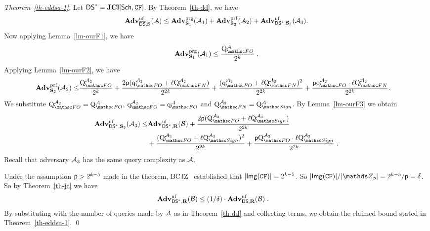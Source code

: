 \begin{proof}[Theorem~\ref{th-eddsa-1}] Let $\mathsf{DS}^* = \mathbf{JCl}[\mathsf{Sch},\mathtt{CF}]$. 
By Theorem~\ref{th-dd}, we have 
	$$\mathbf{Adv}^{\mathrm{uf}}_{\overline{\mathsf{DS}},\mathbf{S}}(\mathcal{A}) \leq   \mathbf{Adv}^{\mathrm{prg}}_{\mathbf{S}_1}(\mathcal{A}_1) + \mathbf{Adv}^{\mathrm{prf}}_{\mathbf{S}_2}(\mathcal{A}_2) + \mathbf{Adv}^{\mathrm{uf}}_{\mathsf{DS}^*,\mathbf{S}_3}(\mathcal{A}_3).$$
Now applying Lemma~\ref{lm-ourF1}, we have  
	$$\prgAdv{\ourF_1}{\advA_1} \leq \frac{
	\Queries{\HASH}{\advA}}{2^k} \;.$$ 
Applying Lemma~\ref{lm-ourF2}, we have
	\begin{align*}
		\prfAdv{\ourF_2}{\advA_2}  \leq& \frac{\Queries{\HASH}{\advA_2}}{2^k}
		+ \frac{2\Prime (\QueriesD{\HASH}{\advA_2}+ \ell \Queries{\FUNCO}{\advA_2})}{2^{2k}}
		+ \frac{(\QueriesD{\HASH}{\advA_2} + \ell \Queries{\FUNCO}{\advA_2})^2}{2^{2k}}
		+ \frac{\Prime\QueriesD{\HASH}{\advA_2} \cdot \ell\Queries{\FUNCO}{\advA_2}}{2^{2k}} 
		.
	\end{align*}
	We substitute $\Queries{\HASH}{\advA_2} = \Queries{\HASH}{\advA}$, $\QueriesD{\HASH}{\advA_2} = \QueriesD{\HASH}{\advA}$  and
	$\Queries{\FUNCO}{\advA_2} = \Queries{\SignO}{\advA}$.
	By Lemma~\ref{lm-ourF3} we obtain
	\begin{align*}
	\ufAdv{\jDS,\ourF_3}{\advA_3} \leq& \ufAdv{\jDS,\construct{R}}{\advB} + \frac{2\Prime(\Queries{\HASH}{\advA_3}+ \ell \Queries{\SignO}{\advA_3})}{2^{2k}} \\
	 	& + \frac{(\Queries{\HASH}{\advA_3}+ \ell \Queries{\SignO}{\advA_3})^2}{2^{2k}}+ \frac{\Prime \Queries{\HASH}{\advA_3}\cdot\ell \Queries{\SignO}{\advA_3}}{2^{2k}} \;.
	\end{align*}
	Recall that adversary $\mathcal{A}_3$ has the same query complexity as $\mathcal{A}$.

Under the assumption $\mathsf{p} > 2^{k-5}$ made in the theorem, 
	BCJZ~\cite{SP:BCJZ21} established that $|\mathsf{Img}(\mathtt{CF})|=2^{k-5}$. So $|\Img(\CFEDSA)|/|\Z_{\Prime}| = 2^{k-5}/\Prime = \delta$. So by Theorem~\ref{th-jc} we have 
\begin{align}
	\mathbf{Adv}^{\mathrm{uf}}_{\mathsf{DS}^*,\mathbf{R}}(\mathcal{B}) &\leq (1/\delta)\cdot\mathbf{Adv}^{\mathrm{uf}}_{\mathsf{DS},\mathbf{R}}(\mathcal{B}) \;.
\end{align}
By substituting with the number of queries made by $\mathcal{A}$ as in Theorem~\ref{th-dd} and collecting terms, we obtain the claimed bound stated in Theorem~\ref{th-eddsa-1}. \qed
\end{proof}

